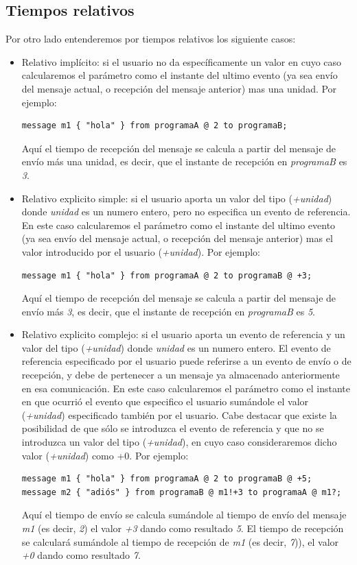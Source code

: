 \documentclass[12pt,a4paper]{report}
\begin{document}
\subsection{Tiempos relativos}

Por otro lado entenderemos por tiempos relativos los siguiente casos:

\begin{itemize}
\item Relativo implícito: si el usuario no da específicamente un valor en cuyo caso calcularemos el parámetro como el instante del ultimo evento (ya sea envío del mensaje actual, o recepción del mensaje anterior) mas una unidad. Por ejemplo:
\begin{verbatim}
message m1 { "hola" } from programaA @ 2 to programaB;
\end{verbatim}
Aquí el tiempo de recepción del mensaje se calcula a partir del mensaje de envío más una unidad, es decir, que el instante de recepción en \textit{programaB} es \textit{3}.
\item Relativo explicito simple: si el usuario aporta un valor del tipo (\textit{+unidad}) donde \textit{unidad} es un numero entero, pero no especifica un evento de referencia. En este caso calcularemos el parámetro como el instante del ultimo evento (ya sea envío del mensaje actual, o recepción del mensaje anterior) mas el valor introducido por el usuario (\textit{+unidad}). Por ejemplo:
\begin{verbatim}
message m1 { "hola" } from programaA @ 2 to programaB @ +3;
\end{verbatim}
Aquí el tiempo de recepción del mensaje se calcula a partir del mensaje de envío más \textit{3}, es decir, que el instante de recepción en \textit{programaB} es \textit{5}.
\item Relativo explicito complejo: si el usuario aporta un evento de referencia y un valor del tipo (\textit{+unidad}) donde \textit{unidad} es un numero entero. El evento de referencia especificado por el usuario puede referirse a un evento de envío o de recepción, y debe de pertenecer a un mensaje ya almacenado anteriormente en esa comunicación. En este caso calcularemos el parámetro como el instante en que ocurrió el evento que especifico el usuario sumándole el valor (\textit{+unidad}) especificado también por el usuario. Cabe destacar que existe la posibilidad de que sólo se introduzca el evento de referencia y que no se introduzca un valor del tipo (\textit{+unidad}), en cuyo caso consideraremos dicho valor (\textit{+unidad}) como +0. Por ejemplo:
\begin{verbatim}
message m1 { "hola" } from programaA @ 2 to programaB @ +5;
message m2 { "adiós" } from programaB @ m1!+3 to programaA @ m1?;
\end{verbatim}
Aquí el tiempo de envío se calcula sumándole al tiempo de envío del mensaje \textit{m1} (es decir, \textit{2}) el valor \textit{+3} dando como resultado \textit{5}. El tiempo de recepción se calculará sumándole al tiempo de recepción de \textit{m1} (es decir, \textit{7})), el valor \textit{+0} dando como resultado \textit{7}.
\end{itemize}
\end{document}
